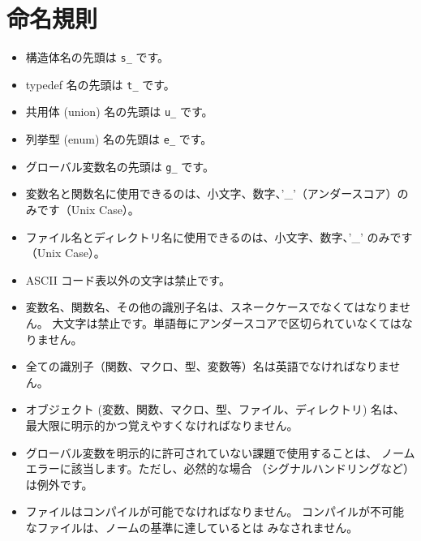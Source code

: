 \documentclass{42-ja}
\begin{document}
    \section{命名規則}

        \begin{itemize}

            \item 構造体名の先頭は
                \texttt{s\_} です。

            \item typedef 名の先頭は
                \texttt{t\_} です。

			\item 共用体 (union) 名の先頭は \texttt{u\_} です。

			\item 列挙型 (enum) 名の先頭は \texttt{e\_} です。

            \item グローバル変数名の先頭は \texttt{g\_} です。

            \item 変数名と関数名に使用できるのは、小文字、数字、'\_'（アンダースコア）のみです（Unix Case）。

            \item ファイル名とディレクトリ名に使用できるのは、小文字、数字、'\_' のみです（Unix Case）。

            \item ASCII コード表以外の文字は禁止です。

            \item 変数名、関数名、その他の識別子名は、スネークケースでなくてはなりません。
				大文字は禁止です。単語毎にアンダースコアで区切られていなくてはなりません。

            \item 全ての識別子（関数、マクロ、型、変数等）名は英語でなければなりません。

			\item オブジェクト (変数、関数、マクロ、型、ファイル、ディレクトリ)
				名は、最大限に明示的かつ覚えやすくなければなりません。

            \item グローバル変数を明示的に許可されていない課題で使用することは、
				ノームエラーに該当します。ただし、必然的な場合
				（シグナルハンドリングなど）は例外です。

            \item ファイルはコンパイルが可能でなければなりません。
				コンパイルが不可能なファイルは、ノームの基準に達しているとは
				みなされません。
        \end{itemize}
\newpage
\end{document}
